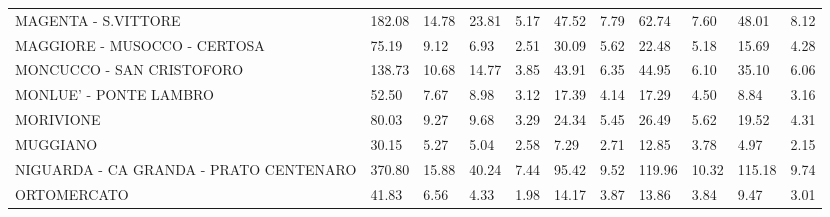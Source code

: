 \begin{table}[H]
{{\begin{tabular}{lp{1.3cm}p{1.3cm}p{1.3cm}p{1.3cm}p{1.3cm}p{1.3cm}p{1.3cm}p{1.3cm}p{1.3cm}p{1.3cm}}
MAGENTA - S.VITTORE                                &                    182.08 &                 14.78 &                       23.81 &                    5.17 &                       47.52 &                    7.79 &                       62.74 &                    7.60 &                     48.01 &                  8.12 \\
MAGGIORE - MUSOCCO - CERTOSA                       &                     75.19 &                  9.12 &                        6.93 &                    2.51 &                       30.09 &                    5.62 &                       22.48 &                    5.18 &                     15.69 &                  4.28 \\
MONCUCCO - SAN CRISTOFORO                          &                    138.73 &                 10.68 &                       14.77 &                    3.85 &                       43.91 &                    6.35 &                       44.95 &                    6.10 &                     35.10 &                  6.06 \\
MONLUE' - PONTE LAMBRO                             &                     52.50 &                  7.67 &                        8.98 &                    3.12 &                       17.39 &                    4.14 &                       17.29 &                    4.50 &                      8.84 &                  3.16 \\
MORIVIONE                                          &                     80.03 &                  9.27 &                        9.68 &                    3.29 &                       24.34 &                    5.45 &                       26.49 &                    5.62 &                     19.52 &                  4.31 \\
MUGGIANO                                           &                     30.15 &                  5.27 &                        5.04 &                    2.58 &                        7.29 &                    2.71 &                       12.85 &                    3.78 &                      4.97 &                  2.15 \\
NIGUARDA - CA GRANDA - PRATO CENTENARO  &                    370.80 &                 15.88 &                       40.24 &                    7.44 &                       95.42 &                    9.52 &                      119.96 &                   10.32 &                    115.18 &                  9.74 \\
ORTOMERCATO                                        &                     41.83 &                  6.56 &                        4.33 &                    1.98 &                       14.17 &                    3.87 &                       13.86 &                    3.84 &                      9.47 &                  3.01 \\

\end{tabular}}}
\end{table}
